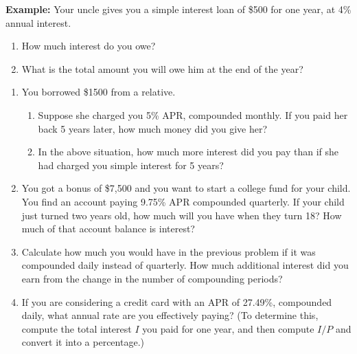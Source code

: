 \documentclass[12pt]{article}
\newcommand{\be}{\begin{enumerate}}
\newcommand{\ee}{\end{enumerate}}
\begin{document}
{\bf Example:} Your uncle gives you a simple interest loan of \$500 for one year, at 4\% annual interest. 

\be
\item How much interest do you owe?

\item What is the total amount you will owe him at the end of the year?
\ee


\begin{enumerate}

\item You borrowed \$1500 from a relative. 
\be
\item Suppose she charged you 5\% APR, compounded monthly. If you paid her back 5 years later, how much money did you give her?

\vfill

\item In the above situation, how much more interest did you pay than if she had charged you simple interest for 5 years?
\vfill
\ee

\newpage

\item You got a bonus of \$7,500 and you want to start a college fund for your child. You find an
account paying 9.75\% APR compounded quarterly. If your child just turned two years old,
how much will you have when they turn 18? How much of that account balance is interest?

\vfill

\item Calculate how much you would have in the previous problem if it was compounded
daily instead of quarterly. How much additional interest did you earn from the change in the number of compounding periods?

\vfill

\item If you are considering a credit card with an APR of 27.49\%, compounded daily, what
annual rate are you effectively paying? (To determine this, compute the total interest $I$ you paid for one year, and then compute $I/P$ and convert it into a percentage.)

\vfill


\end{enumerate}
\end{document}
